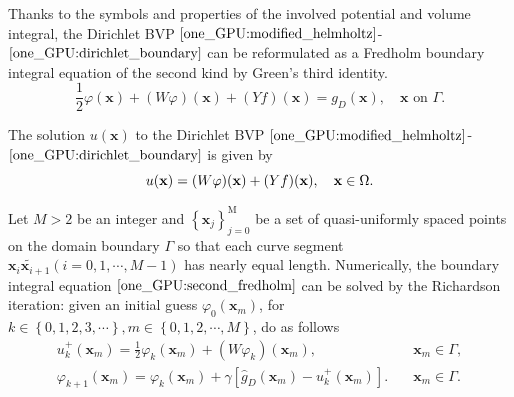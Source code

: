 
Thanks to the symbols and properties of the involved potential and volume integral, the Dirichlet BVP $\eqref{one_GPU:modified_helmholtz}$-$\eqref{one_GPU:dirichlet_boundary}$ can be reformulated as a Fredholm boundary integral equation of the second kind\cite{kress1989linear,hsiao2008boundary} by Green’s third identity.
\begin{equation}
    \frac{1}{2}\varphi (\mathbf{x}) + (W\varphi)(\mathbf{x}) + (Yf)(\mathbf{x}) = g_{D}(\mathbf{x}), \quad \mathbf{x} \text { on } \Gamma. \label{one_GPU:second_fredholm}
\end{equation}

The solution $u(\mathbf{x})$ to the Dirichlet BVP $\eqref{one_GPU:modified_helmholtz}$-$\eqref{one_GPU:dirichlet_boundary}$ is given by 
\begin{equation}
    u(\mathbf{x}) = (W\varphi)(\mathbf{x}) + (Yf)(\mathbf{x}), \quad \mathbf{x} \in \Omega. \label{One_GPU:fredholm_dirichlet} \\
\end{equation}

Let $M>2$ be an integer and $\left\{\mathbf{x}_j\right\}_{j=0}^{\mathrm{M}}$ be a set of quasi-uniformly spaced points on the domain boundary $\Gamma$ so that each curve segment $\widetilde{\mathbf{x}_i \mathbf{x}_{i+1}}(i=0,1, \cdots, M-1)$ has nearly equal length. Numerically, the boundary integral equation $\eqref{one_GPU:second_fredholm}$ can be solved by the Richardson iteration: given an initial guess $\varphi_{0}(\mathbf{x}_{m})$, for $k \in \left\{0, 1, 2, 3, \cdots\right\}, m \in \left\{0, 1, 2, \cdots, M\right\}$, do as follows
\begin{align}
    u_{k}^{+}(\mathbf{x}_{m}) = \frac{1}{2} \varphi_{k}(\mathbf{x}_{m}) + (W\varphi_{k})(\mathbf{x}_{m}), & \quad \mathbf{x}_{m} \in \Gamma, \label{one_GPU:richardson1} \\
    \varphi_{k+1}(\mathbf{x}_{m}) = \varphi_{k}(\mathbf{x}_{m}) + \gamma [\hat{g}_{D}(\mathbf{x}_{m}) - u_{k}^{+}(\mathbf{x}_{m})]. & \quad \mathbf{x}_{m} \in \Gamma.\label{one_GPU:richardson2}
\end{align}

